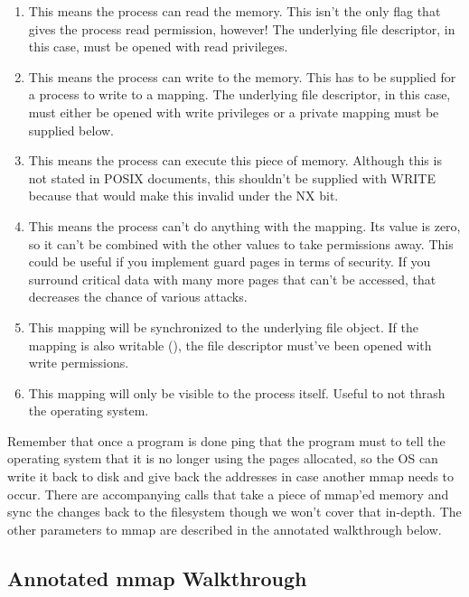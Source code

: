 \begin{enumerate}
	\item {} This means the process can read the memory. This isn't the only flag that gives the process read permission, however! The underlying file descriptor, in this case, must be opened with read privileges.
	\item {} This means the process can write to the memory. This has to be supplied for a process to write to a mapping. The underlying file descriptor, in this case, must either be opened with write privileges or a private mapping must be supplied below.
	\item {} This means the process can execute this piece of memory. Although this is not stated in POSIX documents, this shouldn't be supplied with WRITE because that would make this invalid under the NX bit.
	\item {} This means the process can't do anything with the mapping. Its value is zero, so it can't be combined with the other  values to take permissions away. This could be useful if you implement guard pages in terms of security. If you surround critical data with many more pages that can't be accessed, that decreases the chance of various attacks.
	\item {} This mapping will be synchronized to the underlying file object. If the mapping is also writable (), the file descriptor must've been opened with write permissions.
	\item {} This mapping will only be visible to the process itself. Useful to not thrash the operating system.
\end{enumerate}
	 
Remember that once a program is done ping that the program must  to tell the operating system that it is no longer using the pages allocated, so the OS can write it back to disk and give back the addresses in case another mmap needs to occur.
There are accompanying calls  that take a piece of mmap'ed memory and sync the changes back to the filesystem though we won't cover that in-depth.
The other parameters to mmap are described in the annotated walkthrough below.
	 
\subsection{Annotated mmap Walkthrough}
	 
